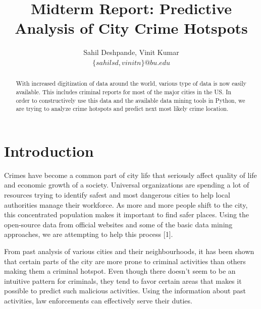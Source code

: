 \documentclass[journal, a4paper]{IEEEtran}
\begin{document}
    \title{Midterm Report: Predictive Analysis of City Crime Hotspots}
    \author{Sahil Deshpande, Vinit Kumar \\ $\{sahilsd, vinitn\}@bu.edu$}
    \maketitle

\begin{abstract}
    With increased digitization of data around the world, various type of data is now easily available. This includes criminal reports for most of the major cities in the US. In order to constructively use this data and the available data mining tools in Python, we are trying to analyze crime hotspots and predict next most likely crime location. 
\end{abstract}

\section{Introduction}
   Crimes have become a common part of city life that seriously affect quality of life and economic growth of a society. Universal organizations are spending a lot of resources trying to identify safest and most dangerous cities to help local authorities manage their workforce. As more and more people shift to the city, this concentrated population makes it important to find safer places. Using the open-source data from official websites and some of the basic data mining approaches, we are attempting to help this process [1].  

   From past analysis of various cities and their neighbourhoods, it has been shown that certain parts of the city are more prone to criminal activities than others making them a criminal hotspot. Even though there doesn't seem to be an intuitive pattern for criminals, they tend to favor certain areas that makes it possible to predict such malicious activities. Using the information about past activities, law enforcements can effectively serve their duties. 
\end{document}
